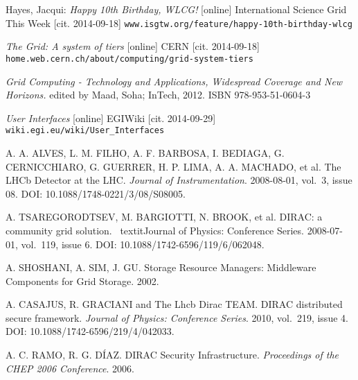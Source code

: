 
\def\bibname{Bibliography}
\begin{thebibliography}{99}
\addcontentsline{toc}{chapter}{\bibname}


	Hayes, Jacqui: 
	\emph{Happy 10th Birthday, WLCG!} [online]
	International Science Grid This Week [cit. 2014-09-18]
	\texttt{www.isgtw.org/feature/happy-10th-birthday-wlcg}

	\emph{The Grid: A system of tiers} [online] 
	CERN [cit. 2014-09-18]
	\texttt{home.web.cern.ch/about/computing/grid-system-tiers}

	\emph{Grid Computing - Technology and Applications, Widespread Coverage and New Horizons.} 
	edited by Maad, Soha; InTech, 2012.
	ISBN 978-953-51-0604-3

	\emph{User Interfaces} [online] 
	EGIWiki [cit. 2014-09-29]
	\texttt{wiki.egi.eu/wiki/User\_Interfaces}
	
	A. A. ALVES, L. M. FILHO, A. F. BARBOSA, I. BEDIAGA, G. CERNICCHIARO, G. GUERRER, H. P. LIMA, A. A. MACHADO, et al. 
	The LHCb Detector at the LHC.
	\textit{Journal of Instrumentation}. 
	2008-08-01, vol.~3, issue 08. 
	DOI: 10.1088/1748-0221/3/08/S08005.
	
	A. TSAREGORODTSEV, M. BARGIOTTI, N. BROOK, et al. 
	DIRAC: a community grid solution. \
	textit{Journal of Physics: Conference Series}. 2008-07-01, vol.~119, issue 6.
	DOI: 10.1088/1742-6596/119/6/062048.
	
	A. SHOSHANI,  A. SIM, J. GU. 
	Storage Resource Managers: Middleware Components for Grid Storage. 
	2002.

	A. CASAJUS,  R. GRACIANI and The Lhcb Dirac TEAM. 
	DIRAC distributed secure framework. 
	\textit{Journal of Physics: Conference Series}. 2010, vol.~219, issue 4. 
	DOI: 10.1088/1742-6596/219/4/042033. 

	A. C. RAMO, R. G. DÍAZ. 
	DIRAC Security Infrastructure. 
	\textit{Proceedings of the CHEP 2006 Conference}. 2006. 
	

\end{thebibliography}
